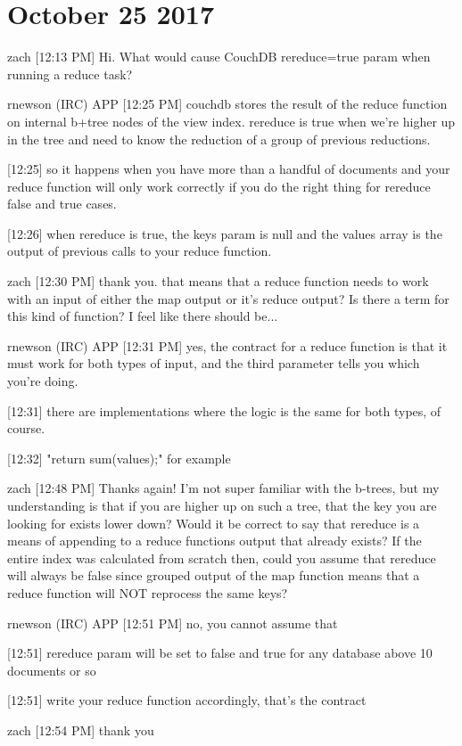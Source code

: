 \section{October 25 2017}
\label{slack-25-oct}
zach [12:13 PM]
Hi. What would cause CouchDB rereduce=true param when running a reduce task?

rnewson (IRC) APP [12:25 PM]
couchdb stores the result of the reduce function on internal b+tree nodes of the view index. rereduce is true when we're higher up in the tree and need to know the reduction of a group of previous reductions.

[12:25]
so it happens when you have more than a handful of documents and your reduce function will only work correctly if you do the right thing for rereduce false and true cases.

[12:26]
when rereduce is true, the keys param is null and the values array is the output of previous calls to your reduce function.

zach [12:30 PM]
thank you. that means that a reduce function needs to work with an input of either the map output or it's reduce output? Is there a term for this kind of function? I feel like there should be...

rnewson (IRC) APP [12:31 PM]
yes, the contract for a reduce function is that it must work for both types of input, and the third parameter tells you which you're doing.

[12:31]
there are implementations where the logic is the same for both types, of course.

[12:32]
"return sum(values);" for example

zach [12:48 PM]
Thanks again! I'm not super familiar with the b-trees, but my understanding is that if you are higher up on such a tree, that the key you are looking for exists lower down? Would it be correct to say that rereduce is a means of appending to a reduce functions output that already exists? If the entire index was calculated from scratch then, could you assume that rereduce will always be false since grouped output of the map function means that a reduce function will NOT reprocess the same keys?

rnewson (IRC) APP [12:51 PM]
no, you cannot assume that

    [12:51]
rereduce param will be set to false and true for any database above 10 documents or so

    [12:51]
write your reduce function accordingly, that's the contract

zach [12:54 PM]
thank you

